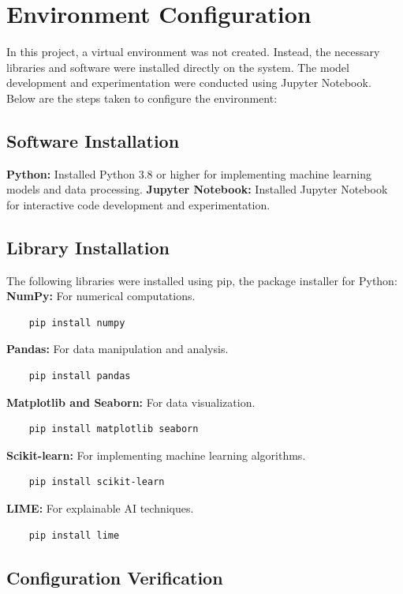 \documentclass[a4paper,12pt]{report}
\begin{document}
\section{Environment Configuration}

In this project, a virtual environment was not created. Instead, the necessary libraries and software were installed directly on the system. The model development and experimentation were conducted using Jupyter Notebook. Below are the steps taken to configure the environment:

\subsection{Software Installation}

     \textbf{Python:} Installed Python 3.8 or higher for implementing machine learning models and data processing.
    \newline \textbf{Jupyter Notebook:} Installed Jupyter Notebook for interactive code development and experimentation.

\subsection{Library Installation}

The following libraries were installed using pip, the package installer for Python:\\
{}
     \textbf{NumPy:} For numerical computations.
    \begin{verbatim}
    pip install numpy
    \end{verbatim}
{}
    \textbf{Pandas:} For data manipulation and analysis.
    \begin{verbatim}
    pip install pandas
    \end{verbatim}
{}
    \textbf{Matplotlib and Seaborn:} For data visualization.
    \begin{verbatim}
    pip install matplotlib seaborn
    \end{verbatim}
{}
   \textbf{Scikit-learn:} For implementing machine learning algorithms.
    \begin{verbatim}
    pip install scikit-learn
    \end{verbatim}
{}
     \textbf{LIME:} For explainable AI techniques.
    \begin{verbatim}
    pip install lime
    \end{verbatim}


\subsection{Configuration Verification}
\end{document}
